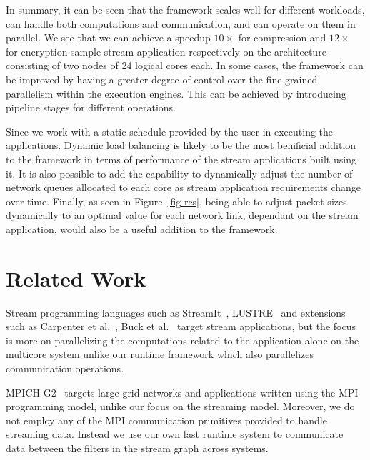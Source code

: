 \documentclass[10pt, conference, compsocconf, reqno]{IEEEtran}
\newcommand{\comment}[1]{}
\begin{document}
In summary, it can be seen that the framework scales well for different workloads, can handle both computations and communication, and can operate on them in parallel. We see that we can achieve a speedup $10\times$ for compression and $12\times$ for encryption sample stream application respectively on the architecture consisting of two nodes of 24 logical cores each. In some cases, the framework can be improved by having a greater degree of control over the fine grained parallelism within the execution engines. This can be achieved by introducing pipeline stages for different operations.

\comment{Results also suggest where efforts should be made in developing the framework further. Until now, the focus has been on deploying the execution engines in order to execute stream applications and to enable optimal communication between separate nodes.}

\comment{Future work will address some of the opportunities presented by these execution engines and the collaboration between them.}

Since we work with a static schedule provided by the user in executing the applications. Dynamic load balancing is likely to be the most benificial addition to the framework in terms of performance of the stream applications built using it. It is also possible to add the capability to dynamically adjust the number of network queues allocated to each core as stream application requirements change over time. Finally, as seen in Figure~\ref{fig-res}, being able to adjust packet sizes dynamically to an optimal value for each network link, dependant on the stream application, would also be a useful addition to the framework.

\section{Related Work}

Stream programming languages such as StreamIt~\cite{Thies:2002:SLS:647478.727935}, LUSTRE~\cite{Halbwachs91thesynchronous} and extensions such as Carpenter et al.~\cite{Carpenter:2007:SMD:1776200.1776217}, Buck et al.~\cite{Buck:2004:BGS:1015706.1015800} target stream applications, but the focus is more on parallelizing the computations related to the application alone on the multicore system unlike our runtime framework which also parallelizes communication operations.

MPICH-G2~\cite{Karonis02mpich-g2:a} targets large grid networks and applications written using the MPI programming model, unlike our focus on the streaming model. Moreover, we do not employ any of the MPI communication primitives provided to handle streaming data. Instead we use our own fast runtime system to communicate data between the filters in the stream graph across systems.
\end{document}
